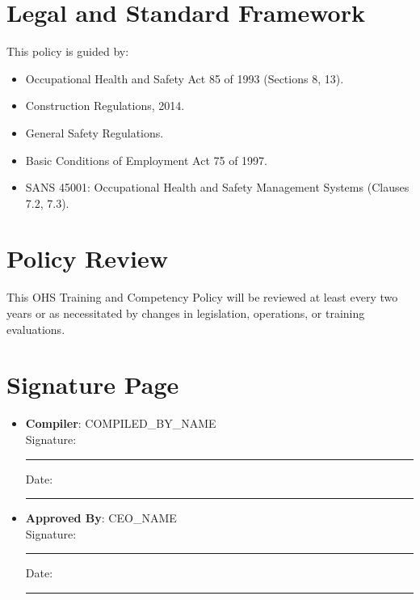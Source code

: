 \documentclass[11pt]{article}
\newcommand{\compilerName}{{{COMPILED_BY_NAME}}}
\begin{document}
\section{Legal and Standard Framework}
This policy is guided by:
\begin{itemize}
    \item Occupational Health and Safety Act 85 of 1993 (Sections 8, 13).
    \item Construction Regulations, 2014.
    \item General Safety Regulations.
    \item Basic Conditions of Employment Act 75 of 1997.
    \item SANS 45001: Occupational Health and Safety Management Systems (Clauses 7.2, 7.3).
\end{itemize}

\section{Policy Review}
This OHS Training and Competency Policy will be reviewed at least every two years or as necessitated by changes in legislation, operations, or training evaluations.

\section{Signature Page}
\begin{itemize}
  \item \textbf{Compiler}: \compilerName \\
    Signature: \rule{5cm}{0.4pt} \quad Date: \rule{3cm}{0.4pt}
  \item \textbf{Approved By}: {{CEO_NAME}} \\
    Signature: \rule{5cm}{0.4pt} \quad Date: \rule{3cm}{0.4pt}
\end{itemize}
\end{document}
